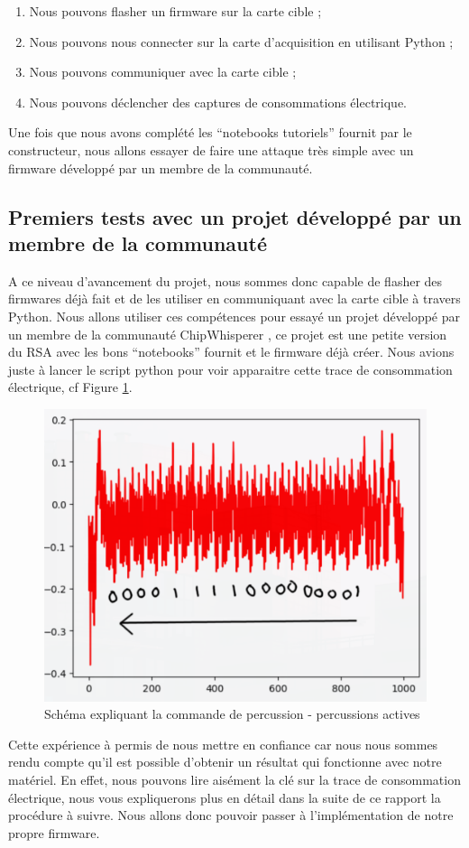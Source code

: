 \begin{enumerate}
	\item Nous pouvons flasher un firmware sur la carte cible ;
	\item Nous pouvons nous connecter sur la carte d'acquisition en utilisant Python ;
	\item Nous pouvons communiquer avec la carte cible ;
	\item Nous pouvons déclencher des captures de consommations électrique.
\end{enumerate}

Une fois que nous avons complété les ``notebooks tutoriels'' fournit par le constructeur, nous allons essayer de faire une attaque très simple avec un firmware développé par un membre de la communauté.

\subsection{Premiers tests avec un projet développé par un membre de la communauté}
A ce niveau d'avancement du projet, nous sommes donc capable de flasher des firmwares déjà fait et de les utiliser en communiquant avec la carte cible à travers Python. Nous allons utiliser ces compétences pour essayé un projet développé par un membre de la communauté ChipWhisperer \cite{git:hell}, ce projet est une petite version du RSA avec les bons ``notebooks'' fournit et le firmware déjà créer. Nous avions juste à lancer le script python pour voir apparaitre cette trace de consommation électrique, cf Figure \ref{fig:hellmanconso}.
\begin{figure}[H]
	\centering
	\includegraphics[width=\textwidth]{fig/hellman_conso.png}
	\caption{Schéma expliquant la commande de percussion - percussions actives}
	\label{fig:hellmanconso}
\end{figure}
Cette expérience à permis de nous mettre en confiance car nous nous sommes rendu compte qu'il est possible d'obtenir un résultat qui fonctionne avec notre matériel. En effet, nous pouvons lire aisément la clé sur la trace de consommation électrique, nous vous expliquerons plus en détail dans la suite de ce rapport la procédure à suivre. Nous allons donc pouvoir passer à l'implémentation de notre propre firmware.

